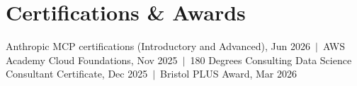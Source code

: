 \documentclass[a4paper,11pt]{article}
\begin{document}
\section{Certifications \& Awards}
Anthropic MCP certifications (Introductory and Advanced), Jun 2026 \,$|$\, AWS Academy Cloud Foundations, Nov 2025 \,$|$\, 180 Degrees Consulting Data Science Consultant Certificate, Dec 2025 \,$|$\, Bristol PLUS Award, Mar 2026
\end{document}
